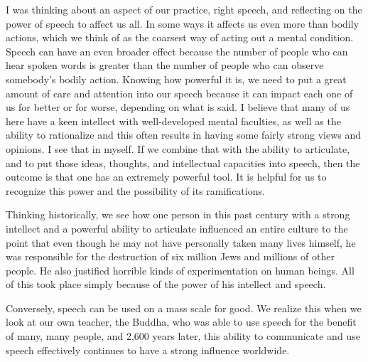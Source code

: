 
I was thinking about an aspect of our practice, right speech, and 
reflecting on the power of speech to affect us all. In some ways it 
affects us even more than bodily actions, which we think of as the 
coarsest way of acting out a mental condition. Speech can have an even 
broader effect because the number of people who can hear spoken words 
is greater than the number of people who can observe somebody's bodily 
action. Knowing how powerful it is, we need to put a great amount of 
care and attention into our speech because it can impact each one of us 
for better or for worse, depending on what is said. I believe that many 
of us here have a keen intellect with well-developed mental faculties, 
as well as the ability to rationalize and this often results in having 
some fairly strong views and opinions. I see that in myself. If we 
combine that with the ability to articulate, and to put those ideas, 
thoughts, and intellectual capacities into speech, then the outcome is 
that one has an extremely powerful tool. It is helpful for us to 
recognize this power and the possibility of its ramifications.

Thinking historically, we see how one person in this past century with 
a strong intellect and a powerful ability to articulate influenced an 
entire culture to the point that even though he may not have personally 
taken many lives himself, he was responsible for the destruction of six 
million Jews and millions of other people. He also justified horrible 
kinds of experimentation on human beings. All of this took place simply 
because of the power of his intellect and speech.

Conversely, speech can be used on a mass scale for good. We realize 
this when we look at our own teacher, the Buddha, who was able to use 
speech for the benefit of many, many people, and 2,600 years later, 
this ability to communicate and use speech effectively continues to 
have a strong influence worldwide.


